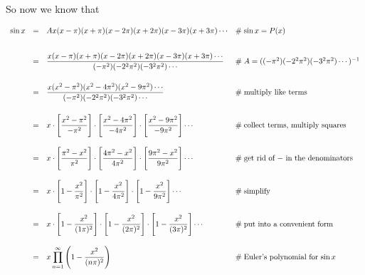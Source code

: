 \documentclass[11pt, oneside]{article}   	%
\begin{document}
\bigskip
\noindent
So now we know that 

\begin{equation*}
\begin{array}{lllll}
\sin x 
&=&  A x (x - \pi)(x + \pi) (x - 2\pi)(x + 2\pi) (x - 3\pi) (x + 3\pi) \cdots                                                                                                                    &\mathrel{\#} \sin x = P(x) \\   
[22pt]                                                     
&=& \dfrac{x (x - \pi)(x+\pi)(x-2\pi)(x+2\pi)(x-3\pi)(x+3\pi) \cdots}{(-\pi^2)(-2^2\pi^2)(-3^2\pi^2) \cdots}                                                                &\mathrel{\#} A = ((-\pi^2) (- 2^2 \pi^2) (-3^2 \pi^2)  \cdots)^{-1}   \\
[22pt]
&=& \dfrac{x (x^2 - \pi^2)(x^2-4\pi^2)(x^2 - 9\pi^2) \cdots}{(-\pi^2)(-2^2\pi^2)(-3^2\pi^2) \cdots}                                                                          &\mathrel{\#} \text{multiply like terms}  \\
[22pt]
&=& x \cdot \Bigg [\dfrac{x^2 - \pi^2}{-\pi^2} \Bigg ] \cdot  \Bigg [\dfrac{x^2 - 4 \pi^2}{- 4 \pi^2} \Bigg ]  \cdot  \Bigg [\dfrac{x^2 - 9 \pi^2}{- 9 \pi^2} \Bigg ]  \cdots 
                                                                                                                                                                                                                              &\mathrel{\#} \text{collect terms, multiply squares} \\
[22pt]
&=& x \cdot \Bigg [\dfrac{\pi^2 - x^2}{\pi^2} \Bigg ] \cdot  \Bigg [\dfrac{4 \pi^2 -  x^2}{4 \pi^2} \Bigg ]  \cdot  \Bigg [\dfrac{9 \pi^2 - x^2}{9 \pi^2} \Bigg ]  \cdots 
                                                                                                                                                                                                                              &\mathrel{\#} \text{get rid of $-$ in the denominators} \\
[22pt]
&=& x \cdot  \Bigg [1 - \dfrac{x^2}{\pi^2} \Bigg ] \cdot \Bigg [1 - \dfrac{x^2}{4\pi^2} \Bigg ] \cdot  \Bigg [1 - \dfrac{x^2}{9\pi^2} \Bigg ] \cdots &\mathrel{\#} \text{simplify}   \\
[22pt]
&=& x \cdot  \Bigg [1 - \dfrac{x^2}{(1 \pi)^2} \Bigg ] \cdot \Bigg [1 - \dfrac{x^2}{(2\pi)^2} \Bigg ] \cdot  \Bigg [1 - \dfrac{x^2}{(3\pi)^2} \Bigg ] \cdots &\mathrel{\#} \text{put into a convenient form}   \\
[22pt]
&=& \mathlarger{ x \prod\limits_{n=1}^\infty \Bigg (1 - \frac{x^2}{(n\pi)^2} \Bigg ) }                                                                                              &\mathrel{\#} \text{Euler's polynomial for $\sin x$}
\end{array}
\end{equation*}
\end{document}
